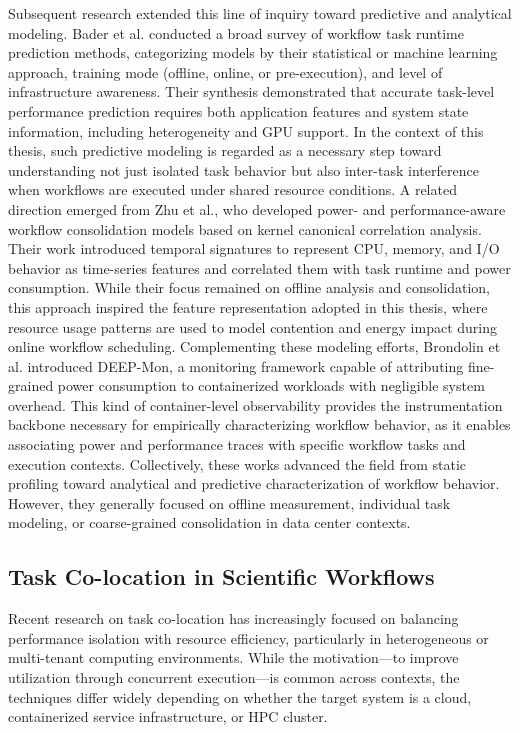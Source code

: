 Subsequent research extended this line of inquiry toward predictive and analytical modeling. Bader et al. conducted a broad survey of workflow task runtime prediction methods, categorizing models by their statistical or machine learning approach, training mode (offline, online, or pre-execution), and level of infrastructure awareness. Their synthesis demonstrated that accurate task-level performance prediction requires both application features and system state information, including heterogeneity and GPU support. In the context of this thesis, such predictive modeling is regarded as a necessary step toward understanding not just isolated task behavior but also inter-task interference when workflows are executed under shared resource conditions.
A related direction emerged from Zhu et al., who developed power- and performance-aware workflow consolidation models based on kernel canonical correlation analysis. Their work introduced temporal signatures to represent CPU, memory, and I/O behavior as time-series features and correlated them with task runtime and power consumption. While their focus remained on offline analysis and consolidation, this approach inspired the feature representation adopted in this thesis, where resource usage patterns are used to model contention and energy impact during online workflow scheduling.
Complementing these modeling efforts, Brondolin et al. introduced DEEP-Mon, a monitoring framework capable of attributing fine-grained power consumption to containerized workloads with negligible system overhead. This kind of container-level observability provides the instrumentation backbone necessary for empirically characterizing workflow behavior, as it enables associating power and performance traces with specific workflow tasks and execution contexts.
Collectively, these works advanced the field from static profiling toward analytical and predictive characterization of workflow behavior. However, they generally focused on offline measurement, individual task modeling, or coarse-grained consolidation in data center contexts.

\subsection{Task Co-location in Scientific Workflows}
\label{sec:relatedwork_task_colocation_scientific_workflows}

Recent research on task co-location has increasingly focused on balancing performance isolation with resource efficiency, particularly in heterogeneous or multi-tenant computing environments. While the motivation—to improve utilization through concurrent execution—is common across contexts, the techniques differ widely depending on whether the target system is a cloud, containerized service infrastructure, or HPC cluster.

